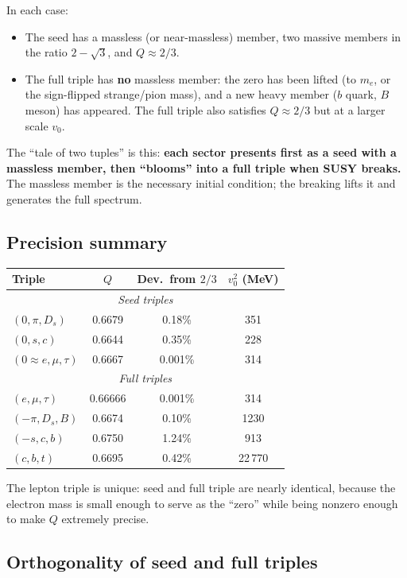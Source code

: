 \documentclass[12pt,a4paper]{article}
\begin{document}
In each case:
\begin{itemize}
\item The seed has a massless (or near-massless) member, two massive 
members in the ratio $2 - \sqrt{3}$, and $Q \approx 2/3$.
\item The full triple has \textbf{no} massless member: the zero has 
been lifted (to $m_e$, or the sign-flipped strange/pion mass), and a 
new heavy member ($b$ quark, $B$ meson) has appeared. The full triple 
also satisfies $Q \approx 2/3$ but at a larger scale $v_0$.
\end{itemize}

The ``tale of two tuples'' is this: \textbf{each sector presents 
first as a seed with a massless member, then ``blooms'' into a 
full triple when SUSY breaks.} The massless member is the necessary 
initial condition; the breaking lifts it and generates the full spectrum.

\subsection{Precision summary}

\begin{center}
\begin{tabular}{lccc}
\toprule
Triple & $Q$ & Dev.\ from $2/3$ & $v_0^2$ (MeV) \\
\midrule
\multicolumn{4}{c}{\textit{Seed triples}} \\
$(0, \pi, D_s)$ & 0.6679 & 0.18\% & 351 \\
$(0, s, c)$ & 0.6644 & 0.35\% & 228 \\
$(0 \approx e, \mu, \tau)$ & 0.6667 & 0.001\% & 314 \\
\midrule
\multicolumn{4}{c}{\textit{Full triples}} \\
$(e, \mu, \tau)$ & 0.66666 & 0.001\% & 314 \\
$(-\pi, D_s, B)$ & 0.6674 & 0.10\% & 1230 \\
$(-s, c, b)$ & 0.6750 & 1.24\% & 913 \\
$(c, b, t)$ & 0.6695 & 0.42\% & 22\,770 \\
\bottomrule
\end{tabular}
\end{center}

The lepton triple is unique: seed and full triple are nearly 
identical, because the electron mass is small enough to serve as 
the ``zero'' while being nonzero enough to make $Q$ extremely 
precise.

\subsection{Orthogonality of seed and full triples}
\end{document}
